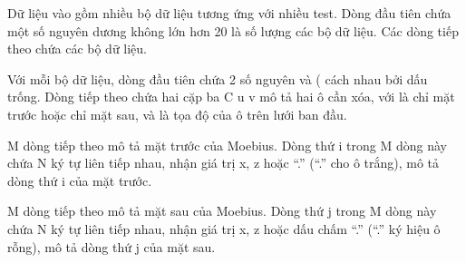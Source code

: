 Dữ liệu vào gồm nhiều bộ dữ liệu tương ứng với nhiều test. Dòng đầu tiên chứa một số nguyên dương không lớn hơn 20 là số lượng các bộ dữ liệu. Các dòng tiếp theo chứa các bộ dữ liệu.  

   Với mỗi bộ dữ liệu, dòng đầu tiên chứa 2 số nguyên   và   (  cách nhau bởi dấu trống. Dòng tiếp theo chứa hai cặp ba C u v mô tả hai ô cần xóa, với   là   chỉ mặt trước hoặc   chỉ mặt sau,    và    là tọa độ của ô trên lưới ban đầu.  

   M dòng tiếp theo mô tả mặt trước của Moebius. Dòng thứ i trong M dòng này chứa N ký tự liên tiếp nhau, nhận giá trị x, z hoặc “.” (“.” cho ô trắng), mô tả dòng thứ i của mặt trước.  

   M dòng tiếp theo mô tả mặt sau của Moebius. Dòng thứ j trong M dòng này chứa N ký tự liên tiếp nhau, nhận giá trị x, z hoặc dấu chấm “.” (“.” ký hiệu ô rỗng), mô tả dòng thứ j của mặt sau.